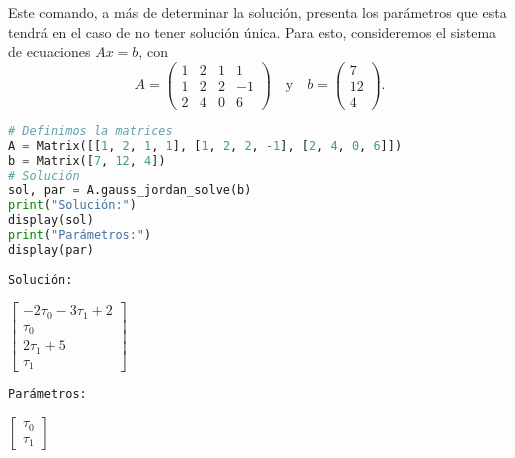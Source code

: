 \documentclass[a4,11pt]{aleph-notas}
\begin{document}
Este comando, a más de determinar la solución, presenta los parámetros que esta tendrá en el caso de no tener solución única. Para esto, consideremos el sistema de ecuaciones \(Ax=b\), con 
\[
    A=\begin{pmatrix}1 & 2 & 1 & 1\\1 & 2 & 2 & -1\\2 & 4 & 0 & 6\end{pmatrix}
    \quad\text{y}\quad
    b=\begin{pmatrix}7\\12\\4\end{pmatrix}.
\]

\begin{pycodigo}
    \begin{ipynbcodigo}\begin{lstlisting}[language=Python]
# Definimos la matrices
A = Matrix([[1, 2, 1, 1], [1, 2, 2, -1], [2, 4, 0, 6]])
b = Matrix([7, 12, 4])
# Solución
sol, par = A.gauss_jordan_solve(b)
print("Solución:")
display(sol)
print("Parámetros:")
display(par)
    \end{lstlisting}\end{ipynbcodigo}
    \begin{ipynbsalida}[2mm]
    \begin{Verbatim}
Solución:
    \end{Verbatim}
    $\displaystyle \left[\begin{matrix}- 2 \tau_{0} - 3 \tau_{1} + 2\\\tau_{0}\\2 \tau_{1} + 5\\\tau_{1}\end{matrix}\right]$
    \begin{Verbatim}
Parámetros:
    \end{Verbatim}
    $\displaystyle \left[\begin{matrix}\tau_{0}\\\tau_{1}\end{matrix}\right]$
    \end{ipynbsalida}
\end{pycodigo}



    
\end{document}
